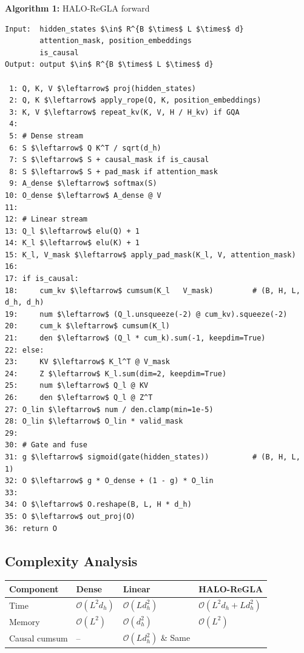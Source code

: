 \textbf{Algorithm 1:} HALO-ReGLA forward
\begin{lstlisting}
Input:  hidden_states $\in$ R^{B $\times$ L $\times$ d}
        attention_mask, position_embeddings
        is_causal
Output: output $\in$ R^{B $\times$ L $\times$ d}

 1: Q, K, V $\leftarrow$ proj(hidden_states)
 2: Q, K $\leftarrow$ apply_rope(Q, K, position_embeddings)
 3: K, V $\leftarrow$ repeat_kv(K, V, H / H_kv) if GQA
 4:
 5: # Dense stream
 6: S $\leftarrow$ Q K^T / sqrt(d_h)
 7: S $\leftarrow$ S + causal_mask if is_causal
 8: S $\leftarrow$ S + pad_mask if attention_mask
 9: A_dense $\leftarrow$ softmax(S)
10: O_dense $\leftarrow$ A_dense @ V
11:
12: # Linear stream
13: Q_l $\leftarrow$ elu(Q) + 1
14: K_l $\leftarrow$ elu(K) + 1
15: K_l, V_mask $\leftarrow$ apply_pad_mask(K_l, V, attention_mask)
16:
17: if is_causal:
18:     cum_kv $\leftarrow$ cumsum(K_l   V_mask)         # (B, H, L, d_h, d_h)
19:     num $\leftarrow$ (Q_l.unsqueeze(-2) @ cum_kv).squeeze(-2)
20:     cum_k $\leftarrow$ cumsum(K_l)
21:     den $\leftarrow$ (Q_l * cum_k).sum(-1, keepdim=True)
22: else:
23:     KV $\leftarrow$ K_l^T @ V_mask
24:     Z $\leftarrow$ K_l.sum(dim=2, keepdim=True)
25:     num $\leftarrow$ Q_l @ KV
26:     den $\leftarrow$ Q_l @ Z^T
27: O_lin $\leftarrow$ num / den.clamp(min=1e-5)
28: O_lin $\leftarrow$ O_lin * valid_mask
29:
30: # Gate and fuse
31: g $\leftarrow$ sigmoid(gate(hidden_states))          # (B, H, L, 1)
32: O $\leftarrow$ g * O_dense + (1 - g) * O_lin
33:
34: O $\leftarrow$ O.reshape(B, L, H * d_h)
35: O $\leftarrow$ out_proj(O)
36: return O
\end{lstlisting}

\subsection{Complexity Analysis}

\begin{table}[H]
\centering
\small
\begin{tabular}{llll}
\toprule
\textbf{Component} & \textbf{Dense} & \textbf{Linear} & \textbf{HALO-ReGLA} \\
\midrule
Time & $\mathcal{O}(L^2 d_h)$ & $\mathcal{O}(L d_h^2)$ & $\mathcal{O}(L^2 d_h + L d_h^2)$ \\
Memory & $\mathcal{O}(L^2)$ & $\mathcal{O}(d_h^2)$ & $\mathcal{O}(L^2)$ \\
Causal cumsum & -- & $\mathcal{O}(L d_h^2)$ \& Same \\
\bottomrule
\end{tabular}
\end{table}


